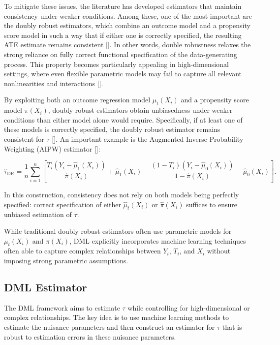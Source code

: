 \documentclass{article}
\numberwithin{equation}{section}
\begin{document}
To mitigate these issues, the literature has developed estimators that maintain consistency under weaker conditions. Among these, one of the most important are the doubly robust estimators, which combine an outcome model and a propensity score model in such a way that if either one is correctly specified, the resulting ATE estimate remains consistent [\cite{RobinsRotnitzkyZhao1994, BangRobins2005}]. In other words, double robustness relaxes the strong reliance on fully correct functional specification of the data-generating process. This property becomes particularly appealing in high-dimensional settings, where even flexible parametric models may fail to capture all relevant nonlinearities and interactions [\cite{Chernozhukov2018}].

By exploiting both an outcome regression model \(\mu_t(X_i)\) and a propensity score model \(\pi(X_i)\), doubly robust estimators obtain unbiasedness under weaker conditions than either model alone would require. Specifically, if at least one of these models is correctly specified, the doubly robust estimator remains consistent for \(\tau\) [\cite{RobinsRotnitzkyZhao1994, BangRobins2005}]. An important example is the Augmented Inverse Probability Weighting (AIPW) estimator [\cite{GlynnQuinn2010}]:

\begin{equation}
    \hat{\tau}_{\text{DR}} = \frac{1}{n}\sum_{i=1}^n \left[
    \frac{T_i(Y_i - \hat{\mu}_1(X_i))}{\hat{\pi}(X_i)} + \hat{\mu}_1(X_i)
    - \frac{(1 - T_i)(Y_i - \hat{\mu}_0(X_i))}{1 - \hat{\pi}(X_i)} - \hat{\mu}_0(X_i)
    \right].
\label{eq:dr_estimator}
\end{equation}

In this construction, consistency does not rely on both models being perfectly specified: correct specification of either \(\hat{\mu}_t(X_i)\) or \(\hat{\pi}(X_i)\) suffices to ensure unbiased estimation of \(\tau\).

While traditional doubly robust estimators often use parametric models for $\mu_t(X_i)$ and $\pi(X_i)$, DML explicitly incorporates machine learning techniques often able to capture complex relationships between $Y_i$, $T_i$, and $X_i$ without imposing strong parametric assumptions.

\subsection{DML Estimator}

The DML framework aims to estimate $\tau$ while controlling for high-dimensional or complex relationships. The key idea is to use machine learning methods to estimate the nuisance parameters and then construct an estimator for $\tau$ that is robust to estimation errors in these nuisance parameters.
\end{document}
